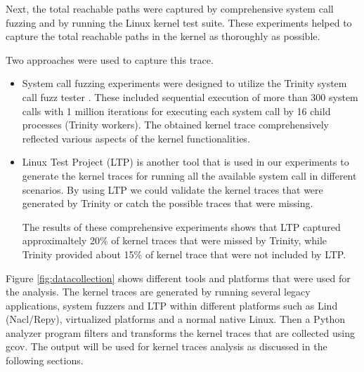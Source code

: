 Next, the total reachable paths were captured by comprehensive system call
fuzzing and by running the Linux kernel test suite. These experiments helped
 to capture the total reachable paths in the kernel as thoroughly as possible.

Two approaches were used to capture this trace.

\begin{itemize}
\item System call fuzzing experiments were designed to utilize the Trinity
 system call fuzz tester \cite{Trinity}. These included sequential execution of more than 300 system calls with 1 million iterations for executing each system call by 16 child processes (Trinity workers). The obtained kernel trace comprehensively reflected various aspects of the kernel functionalities.

\item Linux Test Project (LTP) \cite{LTP} is another tool that is used in our experiments to generate the kernel traces for running all the available system call in different scenarios. By using LTP we could validate the kernel traces that were generated by Trinity or catch the possible traces that were missing.

The results of these comprehensive experiments shows that LTP captured approximaltely 20\% of kernel traces that were missed by Trinity, while Trinity provided about 15\% of kernel trace that were not included by LTP.

\end{itemize}

Figure \ref{fig:datacollection} shows different tools and platforms that were used
 for the analysis. The kernel traces are generated by running several legacy
  applications, system fuzzers and LTP within different platforms such as
  Lind (Nacl/Repy), virtualized platforms and a normal native Linux. Then a Python
   analyzer program filters and transforms the kernel traces that are collected
    using gcov. The output will be used for kernel traces analysis as
    discussed in the following sections.

